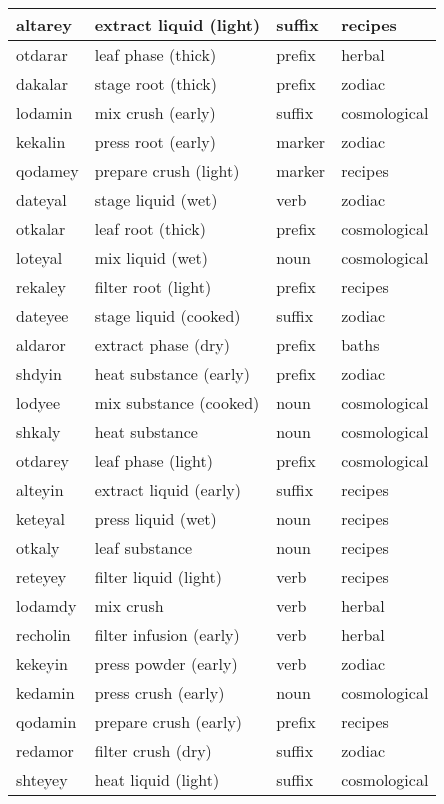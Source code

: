 \documentclass[12pt]{article}
\begin{document}
\begin{longtable}{|l|l|l|l|}
altarey & extract liquid (light) & suffix & recipes \\ \hline
otdarar & leaf phase (thick) & prefix & herbal \\ \hline
dakalar & stage root (thick) & prefix & zodiac \\ \hline
lodamin & mix crush (early) & suffix & cosmological \\ \hline
kekalin & press root (early) & marker & zodiac \\ \hline
qodamey & prepare crush (light) & marker & recipes \\ \hline
dateyal & stage liquid (wet) & verb & zodiac \\ \hline
otkalar & leaf root (thick) & prefix & cosmological \\ \hline
loteyal & mix liquid (wet) & noun & cosmological \\ \hline
rekaley & filter root (light) & prefix & recipes \\ \hline
dateyee & stage liquid (cooked) & suffix & zodiac \\ \hline
aldaror & extract phase (dry) & prefix & baths \\ \hline
shdyin & heat substance (early) & prefix & zodiac \\ \hline
lodyee & mix substance (cooked) & noun & cosmological \\ \hline
shkaly & heat substance & noun & cosmological \\ \hline
otdarey & leaf phase (light) & prefix & cosmological \\ \hline
alteyin & extract liquid (early) & suffix & recipes \\ \hline
keteyal & press liquid (wet) & noun & recipes \\ \hline
otkaly & leaf substance & noun & recipes \\ \hline
reteyey & filter liquid (light) & verb & recipes \\ \hline
lodamdy & mix crush & verb & herbal \\ \hline
recholin & filter infusion (early) & verb & herbal \\ \hline
kekeyin & press powder (early) & verb & zodiac \\ \hline
kedamin & press crush (early) & noun & cosmological \\ \hline
qodamin & prepare crush (early) & prefix & recipes \\ \hline
redamor & filter crush (dry) & suffix & zodiac \\ \hline
shteyey & heat liquid (light) & suffix & cosmological \\ \hline

\end{longtable}
\end{document}
